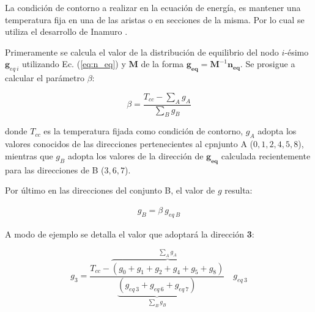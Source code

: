 La condición de contorno a realizar en la ecuación de energía, es mantener una temperatura fija en una de las aristas o en secciones de la misma. Por lo cual se utiliza el desarrollo de Inamuro \cite{inamuro2002lattice}.

Primeramente se calcula el valor de la distribución de equilibrio del nodo $i$-ésimo $\mathbf{g}_{eq\>i}$ utilizando Ec. (\ref{eq:n_eq}) y $\mathbf{M}$ de la forma $\mathbf{g_{eq}} = \mathbf{M}^{-1} \mathbf{n_{eq}}$. Se prosigue a calcular el parámetro $\beta$:

\begin{equation}
\beta = \frac{T_{cc} - \sum_{A} g_{A}}{\sum_{B} g_{B}}
\label{eq:beta}
\end{equation}

donde $T_{cc}$ es la temperatura fijada como condición de contorno, $g_{A}$ adopta los valores conocidos de las direcciones pertenecientes al cpnjunto A ($0, 1, 2, 4, 5, 8 $), mientras que $g_{B}$ adopta los valores de la dirección de $\mathbf{g_{eq}}$ calculada recientemente para las direcciones de B ($3, 6, 7$).

Por último en las direcciones del conjunto B, el valor de $g$ resulta:

\begin{align}
	g_{B} = \beta \> g_{eq \> B} 
\end{align}

A modo de ejemplo se detalla el valor que adoptará la dirección \textbf{3}:

\begin{equation}
	g_{3} = \frac{T_{cc} - \overbrace{\left( g_{0} + g_{1} +g_{2} + g_{4} + g_{5} + g_{8} \right)}^{\sum_{A} g_{A}} }{\underbrace{\left( g_{eq\>3} + g_{eq\>6} + g_{eq\>7} \right)}_{\sum_{B} g_{B} }} \quad g_{eq\>3}
\end{equation}


